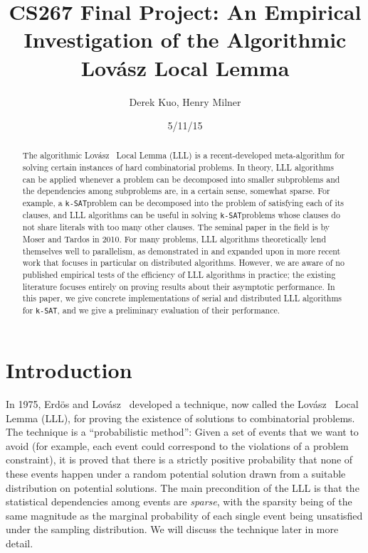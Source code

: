 \documentclass{article}
\author{Derek Kuo, Henry Milner}
\title{CS267 Final Project: An Empirical Investigation of the Algorithmic Lovász Local Lemma}
\date{5/11/15}
\newcommand{\ksat}{\texttt{k-SAT}}
\newcommand{\lovasz}{Lov\'{a}sz}
\begin{document}
\maketitle

\begin{abstract}
The algorithmic \lovasz~ Local Lemma (LLL) is a recent-developed meta-algorithm for solving certain instances of hard combinatorial problems.  In theory, LLL algorithms can be applied whenever a problem can be decomposed into smaller subproblems and the dependencies among subproblems are, in a certain sense, somewhat sparse.  For example, a \ksat problem can be decomposed into the problem of satisfying each of its clauses, and LLL algorithms can be useful in solving \ksat problems whose clauses do not share literals with too many other clauses.  The seminal paper in the field is by Moser and Tardos \cite{moser2010constructive} in 2010.  For many problems, LLL algorithms theoretically lend themselves well to parallelism, as demonstrated in \cite{moser2010constructive} and expanded upon in more recent work \cite{chung2014distributed,haeupler2011new} that focuses in particular on distributed algorithms.  However, we are aware of no published empirical tests of the efficiency of LLL algorithms in practice; the existing literature focuses entirely on proving results about their asymptotic performance.  In this paper, we give concrete implementations of serial and distributed LLL algorithms for \ksat, and we give a preliminary evaluation of their performance.
\end{abstract}

\section{Introduction}
\label{sec:intro}
In 1975, Erd\"{o}s and \lovasz~ \cite{erdos1975problems} developed a technique, now called the \lovasz~ Local Lemma (LLL), for proving the existence of solutions to combinatorial problems.  The technique is a ``probabilistic method'': Given a set of events that we want to avoid (for example, each event could correspond to the violations of a problem constraint), it is proved that there is a strictly positive probability that none of these events happen under a random potential solution drawn from a suitable distribution on potential solutions.  The main precondition of the LLL is that the statistical dependencies among events are \emph{sparse}, with the sparsity being of the same magnitude as the marginal probability of each single event being unsatisfied under the sampling distribution.  We will discuss the technique later in more detail.
\end{document}
